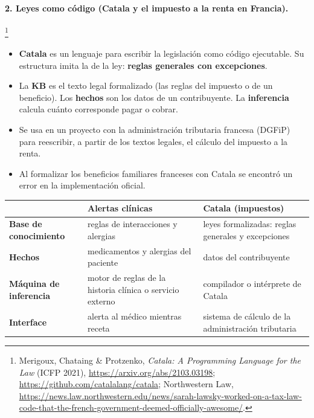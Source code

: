\documentclass[11pt,a4paper]{article}
\newcommand{\fuentesweb}[1]{\footnote{\raggedright #1.}}
\begin{document}
\paragraph{2. Leyes como código (Catala y el impuesto a la renta en Francia).}\fuentesweb{Merigoux, Chataing \& Protzenko, \textit{Catala: A Programming Language for the Law} (ICFP 2021), \url{https://arxiv.org/abs/2103.03198}; \url{https://github.com/catalalang/catala}; Northwestern Law, \url{https://news.law.northwestern.edu/news/sarah-lawsky-worked-on-a-tax-law-code-that-the-french-government-deemed-officially-awesome/}}
\begin{itemize}
  \item \textbf{Catala} es un lenguaje para escribir la legislación como código ejecutable. Su estructura imita la de la ley: \textbf{reglas generales con excepciones}.
  \item La \textbf{KB} es el texto legal formalizado (las reglas del impuesto o de un beneficio). Los \textbf{hechos} son los datos de un contribuyente. La \textbf{inferencia} calcula cuánto corresponde pagar o cobrar.
  \item Se usa en un proyecto con la administración tributaria francesa (DGFiP) para reescribir, a partir de los textos legales, el cálculo del impuesto a la renta.
  \item Al formalizar los beneficios familiares franceses con Catala se encontró un error en la implementación oficial.
\end{itemize}

\begin{center}
\small
\begin{tabularx}{\linewidth}{@{}>{\bfseries}l X X@{}}
\toprule
 & \textbf{Alertas clínicas} & \textbf{Catala (impuestos)} \\
\midrule
Base de conocimiento & reglas de interacciones y alergias & leyes formalizadas: reglas generales y excepciones \\
Hechos & medicamentos y alergias del paciente & datos del contribuyente \\
Máquina de inferencia & motor de reglas de la historia clínica o servicio externo & compilador o intérprete de Catala \\
Interface & alerta al médico mientras receta & sistema de cálculo de la administración tributaria \\
\bottomrule
\end{tabularx}
\end{center}
\end{document}
